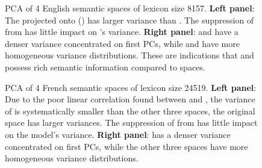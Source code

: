 \begin{figure}
    \centering
    \caption[EVR of 4 Semantic Spaces, English]{PCA of 4 English semantic spaces of lexicon size 8157. \textbf{Left panel}: The projected  onto  () has larger variance than . The suppression of  from  has little impact on 's variance. \textbf{Right panel}:  and  have a denser variance concentrated on first PCs, while  and  have more homogeneous variance distributions. These are indications that  and  possess rich semantic information compared to \similarity spaces.} 
    \label{fig:EngDecorVarRatio}
\end{figure}
\begin{figure}
    \centering
    \caption[EVR of 4 Semantic Spaces, French]{PCA of 4 French semantic spaces of lexicon size 24519. \textbf{Left panel}: Due to the poor linear correlation found between  and , the variance of  is systematically smaller than the other three spaces, the original space  has larger variances. The suppression of  from  has little impact on the model's variance. \textbf{Right panel}:  has a denser variance concentrated on first PCs, while the other three spaces have more homogeneous variance distributions.\label{fig:FreDecorVarRatio}} 

\end{figure}


